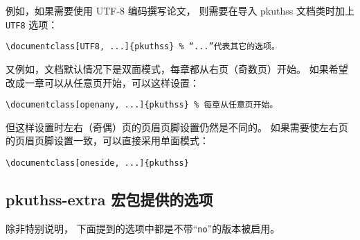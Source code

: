 		例如，如果需要使用 UTF-8 编码撰写论文，
		则需要在导入 pkuthss 文档类时加上 \verb|UTF8| 选项：
\begin{Verbatim}[frame = single]
\documentclass[UTF8, ...]{pkuthss} % “...”代表其它的选项。
\end{Verbatim}

		又例如，文档默认情况下是双面模式，每章都从右页（奇数页）开始。
		如果希望改成一章可以从任意页开始，可以这样设置：
\begin{Verbatim}[frame = single]
\documentclass[openany, ...]{pkuthss} % 每章从任意页开始。
\end{Verbatim}
		但这样设置时左右（奇偶）页的页眉页脚设置仍然是不同的。
		如果需要使左右页的页眉页脚设置一致，可以直接采用单面模式：
\begin{Verbatim}[frame = single]
% 使用 oneside 选项时不需要再指定 openany 选项。
\documentclass[oneside, ...]{pkuthss}
\end{Verbatim}

		\subsection{pkuthss-extra 宏包提供的选项}\label{ssec:extra}

		除非特别说明，
		下面提到的选项中都是不带“\verb|no|”的版本被启用。

